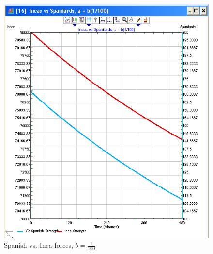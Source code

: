 \documentclass[letterpaper,10pt]{article}
\begin{document}
\begin{figure}[h!tp]
\begin{center}
\includegraphics[scale=0.4]{fig3a.png}
\caption{Spanish vs. Inca forces, $b=\frac{1}{100}$}
\label{fig3a}
\end{center}
\end{figure}
\end{document}
